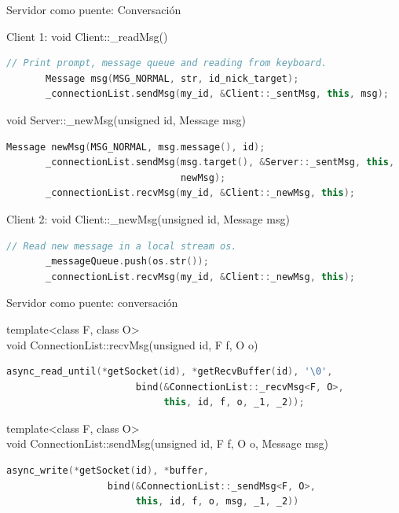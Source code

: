 \documentclass[spanish,xcolor=dvipsnames,svgnames]{beamer}
\begin{document}
\begin{frame}[fragile]{Servidor como puente:  Conversación}
   \begin{block}{Client 1: void Client::\_readMsg()}
     \begin{lstlisting}[language=C++]
       // Print prompt, message queue and reading from keyboard.
       Message msg(MSG_NORMAL, str, id_nick_target);
       _connectionList.sendMsg(my_id, &Client::_sentMsg, this, msg);
     \end{lstlisting}
   \end{block}

   \pause

   \begin{block}{void Server::\_newMsg(unsigned id, Message msg)}
     \begin{lstlisting}[language=C++]
       Message newMsg(MSG_NORMAL, msg.message(), id);
       _connectionList.sendMsg(msg.target(), &Server::_sentMsg, this,
                               newMsg);
       _connectionList.recvMsg(my_id, &Client::_newMsg, this);
     \end{lstlisting}
   \end{block}

   \pause

   \begin{block}{Client 2: void Client::\_newMsg(unsigned id, Message msg)}
     \begin{lstlisting}[language=C++]
       // Read new message in a local stream os.
       _messageQueue.push(os.str());
       _connectionList.recvMsg(my_id, &Client::_newMsg, this);
     \end{lstlisting}
   \end{block}
\end{frame}


\begin{frame}[fragile]{Servidor como puente: conversación}

  \begin{block}{template<class F, class O> \\ void
      ConnectionList::recvMsg(unsigned id, F f, O o)}
    \begin{lstlisting}[language=C++]
      async_read_until(*getSocket(id), *getRecvBuffer(id), '\0',
                       bind(&ConnectionList::_recvMsg<F, O>,
                            this, id, f, o, _1, _2));
    \end{lstlisting}
  \end{block}

  \begin{block}{template<class F, class O> \\
    void ConnectionList::sendMsg(unsigned id, F f, O o, Message msg)}
    \begin{lstlisting}[language=C++]
      async_write(*getSocket(id), *buffer,
                  bind(&ConnectionList::_sendMsg<F, O>,
                       this, id, f, o, msg, _1, _2))
    \end{lstlisting}
  \end{block}
\end{frame}
\end{document}
